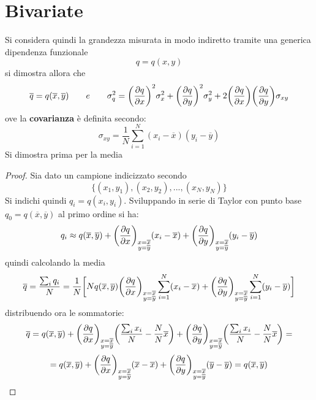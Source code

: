 \documentclass[10pt, oneside]{book}
\begin{document}
\section{Bivariate}
Si considera quindi la grandezza misurata in modo indiretto tramite una generica dipendenza funzionale
\[q = q(x,y)\]
si dimostra allora che
\[\overline{q} = q(\overline{x}, \overline{y}) \qquad e \qquad \sigma^2_q = \bigg(\pdv{q}{x}\bigg)^2 \sigma_x^2 +  \bigg(\pdv{q}{y}\bigg)^2 \sigma_y^2 + 2 \bigg(\pdv{q}{x}\bigg) \bigg(\pdv{q}{y}\bigg) \sigma_{xy}\]
ove la \textbf{covarianza} è definita secondo:
\[\sigma_{xy} = \frac{1}{N} \sum\limits_{i=1}^N (x_i - \overline{x}) (y_i - \overline{y})\]
Si dimostra prima per la media
\begin{proof}
Sia dato un campione indicizzato secondo
\[\big\{ (x_1, y_1), (x_2, y_2), ..., (x_N, y_N) \big\}\]
Si indichi quindi $q_i = q(x_i, y_i)$. Sviluppando in serie di Taylor con punto base $\displaystyle q_0 = q(\overline{x}, \overline{y})$ al primo ordine si ha:
\[q_i \approx q(\overline{x}, \overline{y}) + \bigg(\pdv{q}{x}\bigg)_{\substack{x = \overline{x}\\ y= \overline{y}}} (x_i - \overline{x})+  \bigg(\pdv{q}{y}\bigg)_{\substack{x = \overline{x}\\ y= \overline{y}}} (y_i - \overline{y})\]
quindi calcolando la media 
\[\overline{q} = \frac{\sum_i q_i}{N} = \frac{1}{N} \bigg[N q(\overline{x}, \overline{y})  \bigg(\pdv{q}{x}\bigg)_{\substack{x = \overline{x}\\ y= \overline{y}}} \sum\limits_{i=1}^N (x_i - \overline{x}) +  \bigg(\pdv{q}{y}\bigg)_{\substack{x = \overline{x}\\ y= \overline{y}}} \sum\limits_{i=1}^N (y_i - \overline{y})\bigg]\]
distribuendo ora le sommatorie:
\[\overline{q} = q(\overline{x}, \overline{y}) +\bigg(\pdv{q}{x}\bigg)_{\substack{x = \overline{x}\\ y= \overline{y}}} \bigg(\frac{\sum_i x_i}{N} - \frac{N}{N} \overline{x}\bigg) +  \bigg(\pdv{q}{y}\bigg)_{\substack{x = \overline{x}\\ y= \overline{y}}} \bigg(\frac{\sum_i x_i}{N} - \frac{N}{N} \overline{x}\bigg) = \]
\[= q(\overline{x}, \overline{y}) +\bigg(\pdv{q}{x}\bigg)_{\substack{x = \overline{x}\\ y= \overline{y}}} (\overline{x} - \overline{x}) +  \bigg(\pdv{q}{y}\bigg)_{\substack{x = \overline{x}\\ y= \overline{y}}} (\overline{y} - \overline{y}) = q(\overline{x}, \overline{y})\]
\end{proof}
\end{document}
